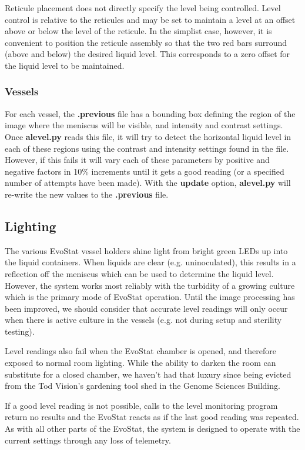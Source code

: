 \documentclass[10pt,letterpaper]{article}
\begin{document}
Reticule placement does not directly specify the level being controlled.  Level control is relative to the reticules and may be set to maintain a level at an offset above or below the level of the reticule. In the simplist case, however, it is convenient to position the reticule assembly so that the two red bars surround (above and below) the desired liquid level.  This corresponds to a zero offset for the liquid level to be maintained.

\subsubsection*{Vessels}

For each vessel, the
{\bf .previous}
file has a bounding box defining the region of the image where the meniscus will be visible, and intensity and contrast settings. Once
{\bf alevel.py}
reads this file, it will try to detect the horizontal liquid level in each of these regions using the contrast and intensity settings found in the file. However, if this fails it will vary each of these parameters by positive and negative factors in 10\% increments until it gets a good reading (or a specified number of attempts have been made).  With the {\bf update} option,
{\bf alevel.py}
will re-write the new values to the
{\bf .previous}
file.

\subsection*{Lighting}

The various EvoStat vessel holders shine light from bright green LEDs up into the liquid containers. When liquids are clear (e.g. uninoculated), this results in a reflection off the meniscus which can be used to determine the liquid level. However, the system works most reliably with the turbidity of a growing culture which is the primary mode of EvoStat operation.  Until the image processing has been improved, we should consider that accurate level readings will only occur when there is active culture in the vessels (e.g. not during setup and sterility testing).

Level readings also fail when the EvoStat chamber is opened, and therefore exposed to normal room lighting.  While the ability to darken the room can substitute for a closed chamber, we haven't had that luxury since being evicted from the Tod Vision's gardening tool shed in the Genome Sciences Building.

If a good level reading is not possible, calls to the level monitoring program return no results and the EvoStat reacts as if the last good reading was repeated.  As with all other parts of the EvoStat, the system is designed to operate with the current settings through any loss of telemetry.
\end{document}

